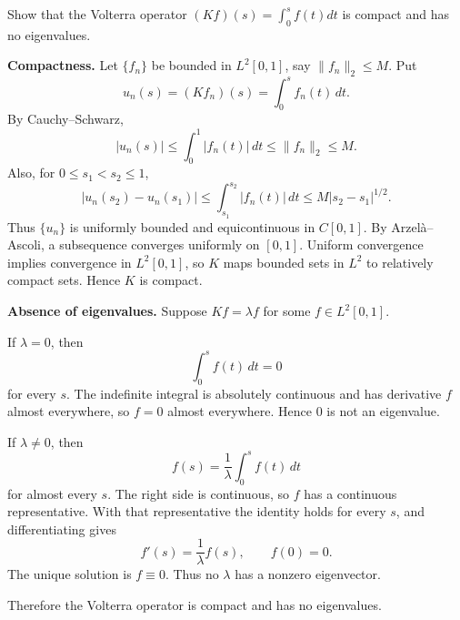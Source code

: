 \begin{exercise}
\label{analysis:2012:12}
Show that the Volterra operator $(Kf)(s) = \int_0^s f(t) dt$ is compact and has no eigenvalues.
\end{exercise}

\begin{solution}
\textbf{Compactness.}
Let $\{f_n\}$ be bounded in $L^2[0,1]$, say $\|f_n\|_2\leq M$. Put
\[
u_n(s)=(Kf_n)(s)=\int_0^s f_n(t)\,dt.
\]
By Cauchy--Schwarz,
\[
|u_n(s)|\leq \int_0^1 |f_n(t)|\,dt\leq \|f_n\|_2\leq M.
\]
Also, for $0\leq s_1<s_2\leq 1$,
\[
|u_n(s_2)-u_n(s_1)|
\leq \int_{s_1}^{s_2}|f_n(t)|\,dt
\leq M |s_2-s_1|^{1/2}.
\]
Thus $\{u_n\}$ is uniformly bounded and equicontinuous in $C[0,1]$. By Arzel\`a--Ascoli, a subsequence converges uniformly on $[0,1]$. Uniform convergence implies convergence in $L^2[0,1]$, so $K$ maps bounded sets in $L^2$ to relatively compact sets. Hence $K$ is compact.

\textbf{Absence of eigenvalues.}
Suppose $Kf=\lambda f$ for some $f\in L^2[0,1]$.

If $\lambda=0$, then
\[
\int_0^s f(t)\,dt=0
\]
for every $s$. The indefinite integral is absolutely continuous and has derivative $f$ almost everywhere, so $f=0$ almost everywhere. Hence $0$ is not an eigenvalue.

If $\lambda\neq 0$, then
\[
f(s)=\frac{1}{\lambda}\int_0^s f(t)\,dt
\]
for almost every $s$. The right side is continuous, so $f$ has a continuous representative. With that representative the identity holds for every $s$, and differentiating gives
\[
f'(s)=\frac{1}{\lambda}f(s),\qquad f(0)=0.
\]
The unique solution is $f\equiv 0$. Thus no $\lambda$ has a nonzero eigenvector.

Therefore the Volterra operator is compact and has no eigenvalues.
\end{solution}
